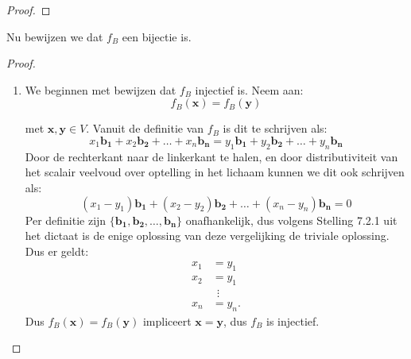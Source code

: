 \documentclass[12pt, a4paper]{article}
\begin{document}
\begin{enumerate}[(a).]
\begin{proof}
        \end{proof}
        Nu bewijzen we dat $f_B$ een bijectie is.
        \begin{proof}\leavevmode
            \begin{enumerate}[1.]
                \item 
                We beginnen met bewijzen dat $f_B$ injectief is. Neem aan: 
                \begin{equation} \label{verg1}
                    f_B(\mathbf{x}) = f_B(\mathbf{y})
                \end{equation}
                
                met $\mathbf{x}, \mathbf{y} \in V$. Vanuit de definitie van $f_B$ is dit te schrijven als:
                \begin{equation}
                    x_1 \mathbf{b_1} + x_2 \mathbf{b_2} + \ldots + x_n \mathbf{b_n} = 
                    y_1 \mathbf{b_1} + y_2 \mathbf{b_2} + \ldots + y_n \mathbf{b_n}
                \end{equation}
                Door de rechterkant naar de linkerkant te halen, en door distributiviteit van het scalair veelvoud over optelling in het lichaam kunnen we dit ook schrijven als:
                \begin{equation}
                    (x_1 - y_1) \mathbf{b_1} + (x_2 - y_2) \mathbf{b_2} + 
                    \ldots + (x_n - y_n) \mathbf{b_n} = 0
                \end{equation}
                Per definitie zijn $\{\mathbf{b_1},\mathbf{b_2}, \ldots, \mathbf{b_n}\}$ onafhankelijk, dus volgens Stelling 7.2.1 uit het dictaat is de enige oplossing van deze vergelijking de triviale oplossing. Dus er geldt:
                \begin{align*}
                    x_1 & = y_1 \\
                    x_2 & = y_1 \\
                    & \ \: \vdots  \\
                    x_n & = y_n.
                \end{align*}
                Dus $f_B(\mathbf{x}) = f_B(\mathbf{y})$ impliceert $\mathbf{x} = \mathbf{y}$, dus $f_B$ is injectief.


\end{enumerate}
\end{proof}
\end{enumerate}
\end{document}
